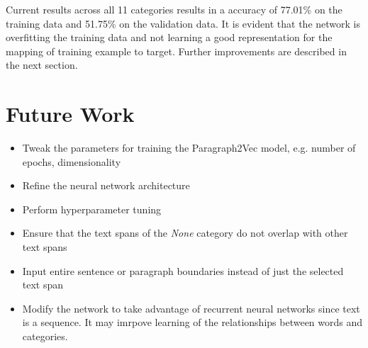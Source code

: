 \documentclass[12pt, letterpaper]{article}
\begin{document}
Current results across all 11 categories results in a accuracy of 77.01\% on the training data and 51.75\% on the validation data. It is evident that the network is overfitting the training data and not learning a good representation for the mapping of training example to target. Further improvements are described in the next section.

\section{Future Work}
\begin{itemize}
\item Tweak the parameters for training the Paragraph2Vec model, e.g. number of epochs, dimensionality
\item Refine the neural network architecture
\item Perform hyperparameter tuning
\item Ensure that the text spans of the \textit{None} category do not overlap with other text spans
\item Input entire sentence or paragraph boundaries instead of just the selected text span
\item Modify the network to take advantage of recurrent neural networks since text is a sequence. It may imrpove learning of the relationships between words and categories.
\end{itemize}
\end{document}
